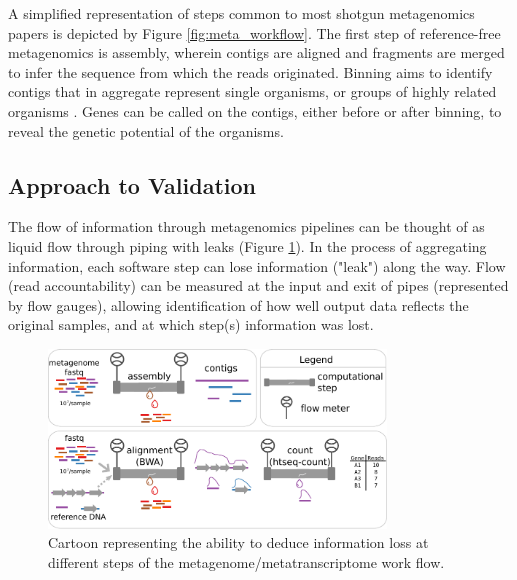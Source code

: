 A simplified representation of steps common to most shotgun metagenomics papers is depicted by Figure \ref{fig:meta_workflow}.
The first step of reference-free metagenomics is assembly, wherein contigs are aligned and fragments are merged to infer the sequence from which the reads originated.
Binning aims to identify contigs that in aggregate represent single organisms, or groups of highly related organisms \cite{kunin2008}.
Genes can be called on the contigs, either before or after binning, to reveal the genetic potential of the organisms.

\subsection{Approach to Validation}
The flow of information through metagenomics pipelines can be thought of as liquid flow through piping with leaks (Figure \ref{fig:pipe_leaks}).
In the process of aggregating information, each software step can lose information ("leak") along the way.
Flow (read accountability) can be measured at the input and exit of pipes (represented by flow gauges), allowing identification of how well output data reflects the original samples, and at which step(s) information was lost.

\begin{figure}[H]
\centering
    \includegraphics[width=0.8\textwidth]{./tex/chapter2/figures/170312_pipe_leaks.pdf}
    \begin{singlespace}
    \caption[Framework for assessing information loss in workflow steps]{
        Cartoon representing the ability to deduce information loss at different steps of the metagenome/metatranscriptome work flow.}
    \label{fig:pipe_leaks}
    \end{singlespace}
\end{figure}

